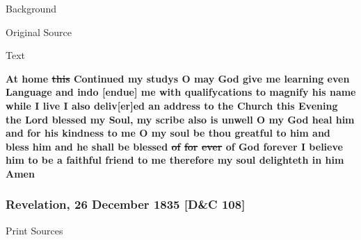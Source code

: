 			\begin{description}
				\item[Background]
			\end{description}
			
			
			\begin{description}
				\item[Original Source]
			\end{description}
			
			
			\begin{description}
				\item[Text]
			\end{description}
			
				\textbf{At home \sout{this} Continued my studys O may God give me learning even Language and indo [endue] me with qualifycations to magnify his name while I live I also deliv[er]ed an address to the Church this Evening the Lord blessed my Soul, my scribe also is unwell O my God heal him and for his kindness to me O my soul be thou greatful to him and bless him and he shall be blessed \sout{of} \sout{for} \sout{ever} of God forever I believe him to be a faithful friend to me therefore my soul delighteth in him Amen}
				
		\subsubsection{Revelation, 26 December 1835 [D\&C 108]}
			\label{EMS-1835-JS-26-DEC-1835}
			
			\begin{description}
				\item[Print Sources]
			\end{description}

